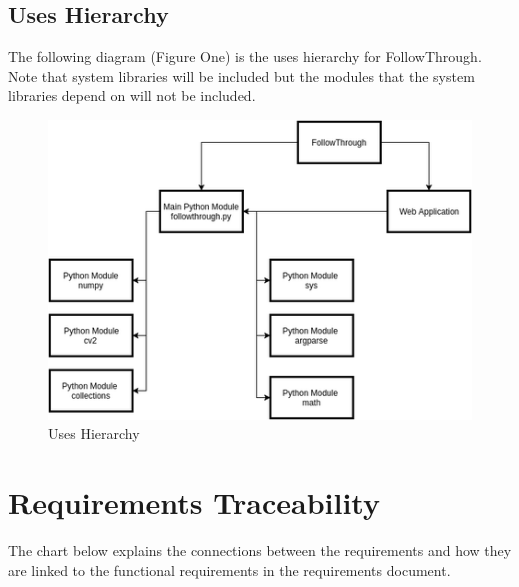 \subsection{Uses Hierarchy}
The following diagram (Figure One) is the uses hierarchy for FollowThrough. Note that system libraries will be included but the modules that the system libraries depend on will not be included.

\begin{figure}[ht]
    \centering
    \includegraphics{uses_hierarchy.png}
    \caption{Uses Hierarchy}
    \label{fig:figure1}
\end{figure}


\section{Requirements Traceability}
The chart below explains the connections between the requirements and how they are linked to the functional requirements in the requirements document.\\

